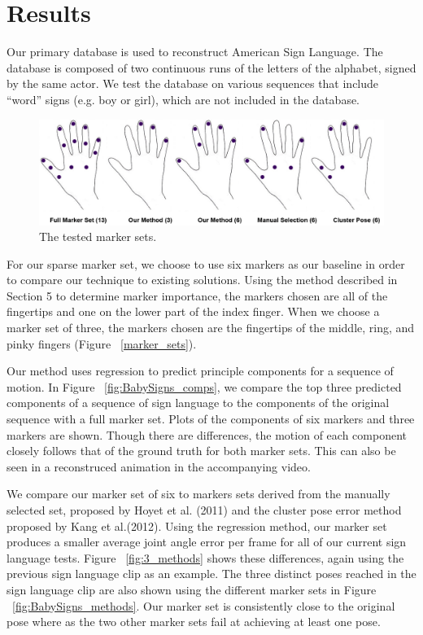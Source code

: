 \section{Results}
Our primary database is used to reconstruct American Sign Language. 
The database is composed of two continuous
runs of the letters of the 
alphabet, signed by the same actor. We test the database
on various sequences that include ``word'' signs (e.g. boy or girl),
which are not included in the database.

\begin{figure}[ht]
  \centering
  \includegraphics[trim = 0mm 0mm 0mm
0mm,width = \textwidth] {images/marker_sets.jpg} %
  \caption{The tested marker sets.}
  \label{fig:marker_sets}
\end{figure}


For our sparse marker set, we choose to use six markers as our
baseline in order to compare our technique to existing solutions. 
Using the method described in Section 5 to determine 
marker importance, the markers chosen are all of the fingertips
and one on the lower part of the index finger. When we choose a
marker set of three, the markers chosen are the fingertips of the 
middle, ring, and pinky fingers (Figure ~\ref{marker_sets}).

Our method uses regression to predict principle components for
a sequence of motion. In Figure ~\ref{fig:BabySigns_comps}, we compare
the top three predicted components of a sequence of sign language
to the components of the original sequence with a full marker set. Plots
of the components of six markers and three markers are shown.
Though there are differences, the motion of each component closely
follows that of the ground truth for both marker sets. This can also be seen
in a reconstruced animation in the accompanying video.

We compare our marker set of six to markers sets derived from the manually
selected set, proposed by Hoyet et al. (2011) and the cluster pose error
method proposed by Kang et al.(2012). Using the regression
method, our marker set produces a smaller average joint angle error per frame 
for all of our current sign language tests. Figure
~\ref{fig:3_methods} shows these differences, again using the previous sign 
language clip as an example. The three distinct poses reached
in the sign language clip are also shown using the different marker
sets in Figure ~\ref{fig:BabySigns_methods}. Our marker set is consistently
close to the original pose where as
the two other marker sets fail at achieving at least one pose.

